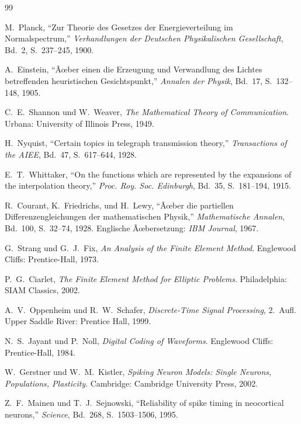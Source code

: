 ﻿\documentclass[a4paper,12pt]{article}
\theoremstyle{definition}
\begin{document}
\clearpage
{}
{}
\begin{thebibliography}{99}

M.~Planck, ``Zur Theorie des Gesetzes der Energieverteilung im Normalspectrum,'' \textit{Verhandlungen der Deutschen Physikalischen Gesellschaft}, Bd.~2, S.~237--245, 1900.

A.~Einstein, ``Ãœber einen die Erzeugung und Verwandlung des Lichtes betreffenden heuristischen Gesichtspunkt,'' \textit{Annalen der Physik}, Bd.~17, S.~132--148, 1905.

C.~E.~Shannon und W.~Weaver, \textit{The Mathematical Theory of Communication}. Urbana: University of Illinois Press, 1949.

H.~Nyquist, ``Certain topics in telegraph transmission theory,'' \textit{Transactions of the AIEE}, Bd.~47, S.~617--644, 1928.

E.~T.~Whittaker, ``On the functions which are represented by the expansions of the interpolation theory,'' \textit{Proc. Roy. Soc. Edinburgh}, Bd.~35, S.~181--194, 1915.

R.~Courant, K.~Friedrichs, und H.~Lewy, ``Ãœber die partiellen Differenzengleichungen der mathematischen Physik,'' \textit{Mathematische Annalen}, Bd.~100, S.~32--74, 1928. Englische Ãœbersetzung: \textit{IBM Journal}, 1967.

G.~Strang und G.~J.~Fix, \textit{An Analysis of the Finite Element Method}. Englewood Cliffs: Prentice-Hall, 1973.

P.~G.~Ciarlet, \textit{The Finite Element Method for Elliptic Problems}. Philadelphia: SIAM Classics, 2002.

A.~V.~Oppenheim und R.~W.~Schafer, \textit{Discrete-Time Signal Processing}, 2.~Aufl. Upper Saddle River: Prentice Hall, 1999.

N.~S.~Jayant und P.~Noll, \textit{Digital Coding of Waveforms}. Englewood Cliffs: Prentice-Hall, 1984.

W.~Gerstner und W.~M.~Kistler, \textit{Spiking Neuron Models: Single Neurons, Populations, Plasticity}. Cambridge: Cambridge University Press, 2002.

Z.~F.~Mainen und T.~J.~Sejnowski, ``Reliability of spike timing in neocortical neurons,'' \textit{Science}, Bd.~268, S.~1503--1506, 1995.


\end{thebibliography}
\end{document}
